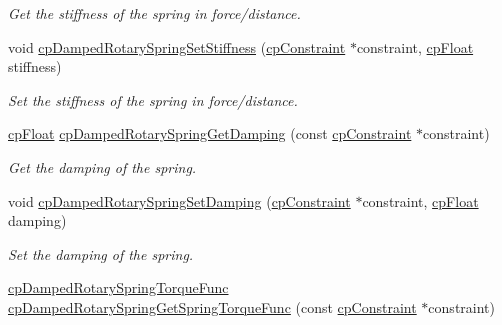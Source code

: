 \begin{DoxyCompactItemize}
\begin{DoxyCompactList}\small\item\em Get the stiffness of the spring in force/distance. \end{DoxyCompactList}\item 
\hypertarget{group__cp_damped_rotary_spring_ga52267ce49d1ea30b5bd40adf9a2f7088}{}void \hyperlink{group__cp_damped_rotary_spring_ga52267ce49d1ea30b5bd40adf9a2f7088}{cp\+Damped\+Rotary\+Spring\+Set\+Stiffness} (\hyperlink{structcp_constraint}{cp\+Constraint} $\ast$constraint, \hyperlink{group__basic_types_gac1ed65573e035bf892505768c852d8d3}{cp\+Float} stiffness)\label{group__cp_damped_rotary_spring_ga52267ce49d1ea30b5bd40adf9a2f7088}

\begin{DoxyCompactList}\small\item\em Set the stiffness of the spring in force/distance. \end{DoxyCompactList}\item 
\hypertarget{group__cp_damped_rotary_spring_gab85f0157c1c14bf037d01009d81eecf7}{}\hyperlink{group__basic_types_gac1ed65573e035bf892505768c852d8d3}{cp\+Float} \hyperlink{group__cp_damped_rotary_spring_gab85f0157c1c14bf037d01009d81eecf7}{cp\+Damped\+Rotary\+Spring\+Get\+Damping} (const \hyperlink{structcp_constraint}{cp\+Constraint} $\ast$constraint)\label{group__cp_damped_rotary_spring_gab85f0157c1c14bf037d01009d81eecf7}

\begin{DoxyCompactList}\small\item\em Get the damping of the spring. \end{DoxyCompactList}\item 
\hypertarget{group__cp_damped_rotary_spring_ga066a2e439bc8009217448887f7a8f608}{}void \hyperlink{group__cp_damped_rotary_spring_ga066a2e439bc8009217448887f7a8f608}{cp\+Damped\+Rotary\+Spring\+Set\+Damping} (\hyperlink{structcp_constraint}{cp\+Constraint} $\ast$constraint, \hyperlink{group__basic_types_gac1ed65573e035bf892505768c852d8d3}{cp\+Float} damping)\label{group__cp_damped_rotary_spring_ga066a2e439bc8009217448887f7a8f608}

\begin{DoxyCompactList}\small\item\em Set the damping of the spring. \end{DoxyCompactList}\item 
\hypertarget{group__cp_damped_rotary_spring_gabe1cb9042a877f3b983b69447b023f79}{}\hyperlink{group__cp_damped_rotary_spring_ga072c236959020fab4f30087b5234040b}{cp\+Damped\+Rotary\+Spring\+Torque\+Func} \hyperlink{group__cp_damped_rotary_spring_gabe1cb9042a877f3b983b69447b023f79}{cp\+Damped\+Rotary\+Spring\+Get\+Spring\+Torque\+Func} (const \hyperlink{structcp_constraint}{cp\+Constraint} $\ast$constraint)\label{group__cp_damped_rotary_spring_gabe1cb9042a877f3b983b69447b023f79}


\end{DoxyCompactItemize}
